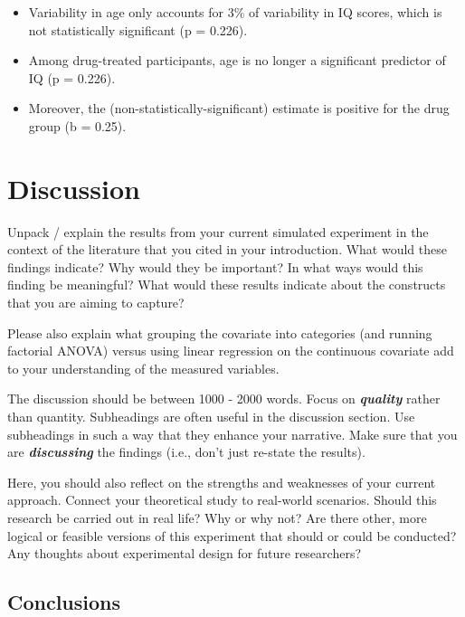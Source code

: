 \documentclass[
]{book}
\providecommand{\tightlist}{%
  \setlength{\itemsep}{0pt}\setlength{\parskip}{0pt}}
\begin{document}
\begin{itemize}
\tightlist
\item
  Variability in age only accounts for 3\% of variability in IQ scores, which is not statistically significant (p = 0.226).
\item
  Among drug-treated participants, age is no longer a significant predictor of IQ (p = 0.226).
\item
  Moreover, the (non-statistically-significant) estimate is positive for the drug group (b = 0.25).
\end{itemize}

\section*{Discussion}\label{discussion}

Unpack / explain the results from your current simulated experiment in the context of the literature that you cited in your introduction. What would these findings indicate? Why would they be important? In what ways would this finding be meaningful? What would these results indicate about the constructs that you are aiming to capture?

Please also explain what grouping the covariate into categories (and running factorial ANOVA) versus using linear regression on the continuous covariate add to your understanding of the measured variables.

The discussion should be between 1000 - 2000 words. Focus on \textbf{\emph{quality}} rather than quantity. Subheadings are often useful in the discussion section. Use subheadings in such a way that they enhance your narrative. Make sure that you are \textbf{\emph{discussing}} the findings (i.e., don't just re-state the results).

Here, you should also reflect on the strengths and weaknesses of your current approach. Connect your theoretical study to real-world scenarios. Should this research be carried out in real life? Why or why not? Are there other, more logical or feasible versions of this experiment that should or could be conducted? Any thoughts about experimental design for future researchers?

\subsection*{Conclusions}\label{conclusions}
\end{document}

